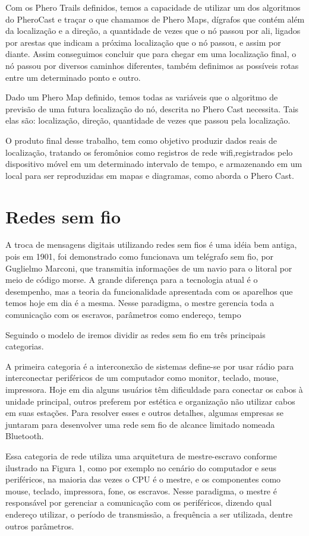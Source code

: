 \documentclass[12pt, %
openright, 
oneside,
a4paper,
brazil]{facom-ufu-abntex2}
\begin{document}
	Com os Phero Trails definidos, temos a capacidade de utilizar um dos algoritmos do PheroCast e traçar o que chamamos de Phero Maps, dígrafos que contém além da localização e a direção, a quantidade de vezes que o nó passou por ali, ligados por arestas que indicam a próxima localização que o nó passou, e assim por diante. Assim conseguimos concluir que para chegar em uma localização final, o nó passou por diversos caminhos diferentes, também definimos as possíveis rotas entre um determinado ponto e outro.
	
	Dado um Phero Map definido, temos todas as variáveis que o algoritmo de previsão de uma futura localização do nó, descrita no Phero Cast necessita. Tais elas são: localização, direção, quantidade de vezes que passou pela localização. 
	
 	O produto final desse trabalho, tem como objetivo produzir dados reais de localização, tratando os feromônios como registros de rede wifi,registrados pelo dispositivo móvel em um determinado intervalo de tempo, e armazenando em um local para ser reproduzidas em mapas e diagramas, como aborda o Phero Cast.

\section{Redes sem fio}
A troca de mensagens digitais utilizando redes sem fios é uma idéia bem antiga, pois em 1901, foi demonstrado como funcionava um telégrafo sem fio, por Guglielmo Marconi, que transmitia informações de um navio para o litoral por meio de código morse. A grande diferença para a tecnologia atual é o desempenho, mas a teoria da funcionalidade apresentada com os aparelhos que temos hoje em dia é a mesma. Nesse paradigma, o mestre gerencia toda a comunicação com os escravos, parâmetros como endereço, tempo 

Seguindo o modelo de \cite{tanenbaum2003redes} iremos dividir as redes sem fio em três principais categorias.

A primeira categoria é a interconexão de sistemas define-se por usar rádio para interconectar periféricos de um computador como monitor, teclado, mouse, impressora. Hoje em dia alguns usuários têm dificuldade para conectar os cabos à unidade principal, outros preferem por estética e organização não utilizar cabos em suas estações. Para resolver esses e outros detalhes, algumas empresas se juntaram para desenvolver uma rede sem fio de alcance limitado nomeada Bluetooth.

Essa categoria de rede utiliza uma arquitetura de mestre-escravo conforme ilustrado na Figura 1, como por exemplo no cenário do computador e seus periféricos, na maioria das vezes o CPU é o mestre, e os componentes como mouse, teclado, impressora, fone, os escravos. Nesse paradigma, o mestre é responsável por gerenciar a comunicação com os periféricos, dizendo qual endereço utilizar, o período de transmissão, a frequência a ser utilizada, dentre outros parâmetros.
\end{document}
